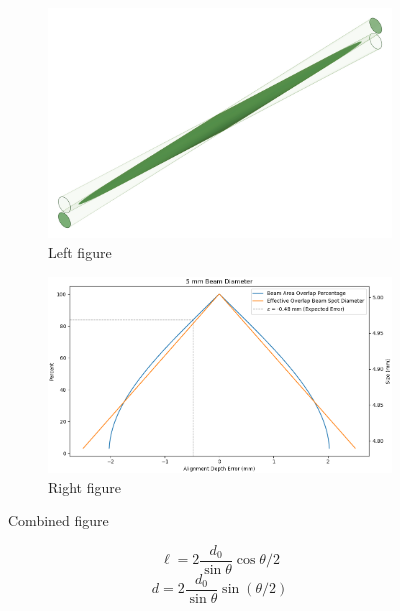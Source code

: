 \begin{figure}
    \centering
    \begin{subfigure}{0.45\textwidth}
        \centering
        \includegraphics[width = \textwidth]{../figures/beam_intersection_nooutline.png}
        \caption{Left figure}
        \label{fig:left}
    \end{subfigure}
    \begin{subfigure}{0.53\textwidth}
        \centering
        \includegraphics[width = \textwidth]{../figures/BeamAlignmentMargin.png}
        \caption{Right figure}
        \label{fig:right}
    \end{subfigure}
    \caption{Combined figure}
    \label{fig:beam_intersection_margin}
\end{figure}
%
\begin{equation}
    \ell = 2 \frac{d_0}{\sin{\theta}} \cos{\theta/2}
\end{equation}
%
\begin{equation}
    d = 2 \frac{d_0}{\sin{\theta}} \sin{(\theta/2)}
\end{equation}

